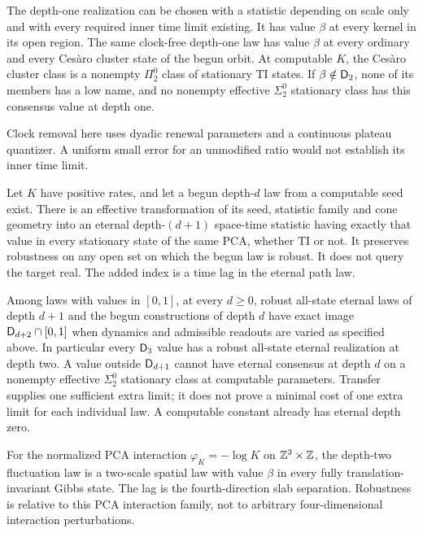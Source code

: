 \begin{theorem}
\label{thm:clockfree}
The depth-one realization can be chosen with a statistic depending
on scale only and with every required inner time limit existing.
It has value $\beta$ at every kernel in its open region. The same
clock-free depth-one law has value $\beta$ at every ordinary and
every Ces\`aro cluster state of the begun orbit. At computable $K$,
the Ces\`aro cluster class is a nonempty $\Pi^0_2$ class of
stationary TI states. If $\beta\notin\mathsf D_2$, none of its members
has a low name, and no nonempty effective $\Sigma^0_2$ stationary
class has this consensus value at depth one.
\end{theorem}
Clock removal here uses dyadic renewal parameters and a continuous
plateau quantizer. A uniform small error for an unmodified ratio
would not establish its inner time limit.

\begin{theorem}\label{thm:transfer}
Let $K$ have positive rates, and let a begun depth-$d$ law from
a computable seed exist. There is an effective transformation of
its seed, statistic family and cone geometry into an eternal
depth-$(d+1)$ space-time statistic having exactly that value in
every stationary state of the same PCA, whether TI or not.
It preserves robustness on any open set on which the begun law
is robust. It does not query the target real. The added index
is a time lag in the eternal path law.
\end{theorem}

\begin{corollary}\label{cor:sharp}
Among laws with values in $[0,1]$, at every $d\geq0$, robust
all-state eternal laws of depth $d+1$
and the begun constructions of depth $d$ have exact image
$\mathsf D_{d+2}\cap[0,1]$ when dynamics and admissible readouts are
varied as specified above. In particular every $\mathsf D_3$ value has
a robust all-state eternal realization at depth two. A value
outside $\mathsf D_{d+1}$ cannot have eternal consensus at depth $d$
on a nonempty effective $\Sigma^0_2$ stationary class at computable
parameters. Transfer supplies one sufficient extra limit; it
does not prove a minimal cost of one extra limit for each
individual law. A computable constant already has eternal depth zero.
\end{corollary}

\begin{corollary}\label{cor:gibbs}
For the normalized PCA interaction $\varphi_K=-\log K$ on
$\mathbb Z^3\times\mathbb Z$, the depth-two fluctuation law is a two-scale
spatial law with value $\beta$ in every fully translation-invariant
Gibbs state. The lag is the fourth-direction slab separation.
Robustness is relative to this PCA interaction family, not to
arbitrary four-dimensional interaction perturbations.
\end{corollary}

